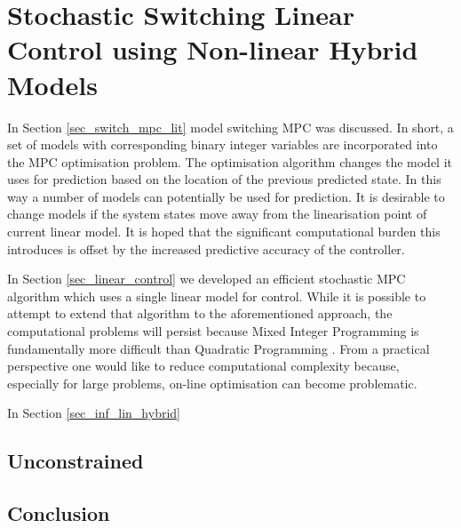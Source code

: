 \chapter{Stochastic Switching Linear Control using Non-linear Hybrid Models}
\label{sec_rbpf_control}
In Section \ref{sec_switch_mpc_lit} model switching MPC was discussed. In short, a set of models with corresponding binary integer variables are incorporated into the MPC optimisation problem. The optimisation algorithm changes the model it uses for prediction based on the location of the previous predicted state. In this way a number of models can potentially be used for prediction. It is desirable to change models if the system states move away from the linearisation point of current linear model. It is hoped that the significant computational burden this introduces is offset by the increased predictive accuracy of the controller.

In Section \ref{sec_linear_control} we developed an efficient stochastic MPC algorithm which uses a single linear model for control. While it is possible to attempt to extend that algorithm to the aforementioned approach, the computational problems will persist because Mixed Integer Programming is fundamentally more difficult than Quadratic Programming \cite{forst}. From a practical perspective one would like to reduce computational complexity because, especially for large problems, on-line optimisation can become problematic.

In Section \ref{sec_inf_lin_hybrid}

\section{Unconstrained}

\section{Conclusion}


